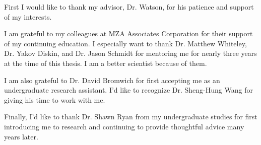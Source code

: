 First I would like to thank my advisor, Dr. Watson, for his patience and support of my interests.

I am grateful to my colleagues at MZA Associates Corporation for their support of my continuing education. I especially want to thank Dr. Matthew Whiteley,  Dr. Yakov Diskin, and Dr. Jason Schmidt for mentoring me for nearly three years at the time of this thesis. I am a better scientist because of them.

I am also grateful to Dr. David Bromwich for first accepting me as an undergraduate research assistant. I'd like to recognize Dr. Sheng-Hung Wang for giving his time to work with me.

Finally, I'd like to thank Dr. Shawn Ryan from my undergraduate studies for first introducing me to research and continuing to provide thoughtful advice many years later.